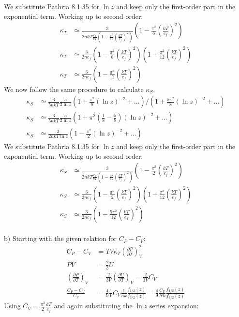 \documentclass[a4paper,11pt]{article}
\numberwithin{equation}{section}
\begin{document}
We substitute Pathria 8.1.35 for $\ln{z}$ and keep only the first-order part in the exponential term. Working up to second order:
\begin{align}
 \kappa_T &\simeq \frac{3}{2nkT\frac{e_f}{kT}(1-\frac{\pi^2}{12}(\frac{kT}{e_f})^2)}(1-\frac{\pi^2}{6}(\frac{kT}{e_f})^{2})\\
 \kappa_T &\simeq \frac{3}{2ne_f}(1-\frac{\pi^2}{6}(\frac{kT}{e_f})^{2})(1+\frac{\pi^2}{12}(\frac{kT}{e_f})^2)\\
 \kappa_T &\simeq \frac{3}{2ne_f}\left(1-\frac{\pi^2}{12}(\frac{kT}{e_f})^{2}\right)
\end{align}
We now follow the same procedure to calculate $\kappa_S$.
\begin{align}
 \kappa_S &\simeq \frac{3}{5nkT}\frac{5}{2\ln{z}}(1+\frac{\pi^2}{8}(\ln{z})^{-2}+...)/(1+\frac{5\pi^2}{8}(\ln{z})^{-2}+...)\\
 \kappa_S &\simeq \frac{3}{5nkT}\frac{5}{2\ln{z}}(1+\pi^2(\frac{1}{8}-\frac{5}{8})(\ln{z})^{-2}+...)\\
 \kappa_S &\simeq \frac{3}{2nkT\ln{z}}(1-\frac{\pi^2}{2}(\ln{z})^{-2}+...)
\end{align}
We substitute Pathria 8.1.35 for $\ln{z}$ and keep only the first-order part in the exponential term. Working up to second order:
\begin{align}
 \kappa_S &\simeq \frac{3}{2nkT\frac{e_f}{kT}(1-\frac{\pi^2}{12}(\frac{kT}{e_f})^2)}(1-\frac{\pi^2}{2}(\frac{kT}{e_f})^{2})\\
 \kappa_S &\simeq \frac{3}{2ne_f}(1-\frac{\pi^2}{2}(\frac{kT}{e_f})^{2})(1+\frac{\pi^2}{12}(\frac{kT}{e_f})^2)\\
 \kappa_S &\simeq \frac{3}{2ne_f}\left(1-\frac{5\pi^2}{12}(\frac{kT}{e_f})^{2}\right)
\end{align}
\\
b) Starting with the given relation for $C_P-C_V$:
\begin{align}
 C_P-C_V &= TV\kappa_T\left(\frac{\partial P}{\partial T} \right)_V^2\\
 PV &= \frac{2}{3}U\\
 \left(\frac{\partial P}{\partial T} \right)_V &= \frac{2}{3V}\left(\frac{\partial U}{\partial T} \right)_V = \frac{2}{3V}C_V\\
 \frac{C_P-C_V}{C_V} &= \frac{4}{9} \frac{1}{V}C_V\frac{1}{nk}\frac{f_{1/2}(z)}{f_{3/2}(z)} = \frac{4}{9}\frac{C_V}{Nk}\frac{f_{1/2}(z)}{f_{3/2}(z)} 
\end{align}
Using $C_V=\frac{\pi^2}{2}\frac{kT}{e_f}$ and again substituting the $\ln{z}$ series expansion:
\end{document}
